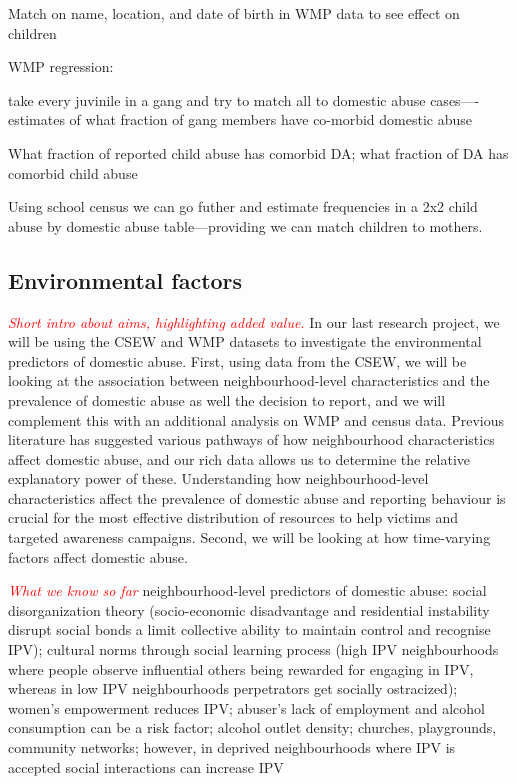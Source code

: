 \documentclass[11pt, a4paper]{article}
\begin{document}
Match on name, location, and date of birth in WMP data to see effect on children

WMP regression:

take every juvinile in a gang and try to match all to domestic abuse cases----estimates of what fraction of gang members have co-morbid domestic abuse

What fraction of reported child abuse has comorbid DA; what fraction of DA has comorbid child abuse

Using school census we can go futher and estimate frequencies in a 2x2 child abuse  by domestic abuse table---providing we can match children to mothers.



\newpage

\subsection*{Environmental factors}

\textcolor{red}{\textit{Short intro about aims, highlighting added value.}}
In our last research project, we will be using the CSEW and WMP datasets to investigate the environmental predictors of domestic abuse. First, using data from the CSEW, we will be looking at the association between neighbourhood-level characteristics and the prevalence of domestic abuse as well the decision to report, and we will complement this with an additional analysis on WMP and census data. Previous literature has suggested various pathways of how neighbourhood characteristics affect domestic abuse, and our rich data allows us to determine the relative explanatory power of these. Understanding how neighbourhood-level characteristics affect the prevalence of domestic abuse and reporting behaviour is crucial for the most effective distribution of resources to help victims and targeted awareness campaigns. Second, we will be looking at how time-varying factors affect domestic abuse. 




\textcolor{red}{\textit{What we know so far}}  neighbourhood-level predictors of domestic abuse: social disorganization theory (socio-economic disadvantage and residential instability disrupt social bonds a limit collective ability to maintain control and recognise IPV); cultural norms through social learning process (high IPV neighbourhoods where people observe influential others being rewarded for engaging in IPV, whereas in low IPV neighbourhoods perpetrators get socially ostracized); women's empowerment reduces IPV;  abuser's lack of employment and alcohol consumption can be a risk factor; alcohol outlet density; churches, playgrounds, community networks;  however, in deprived neighbourhoods where IPV is accepted social interactions can increase IPV
\end{document}
